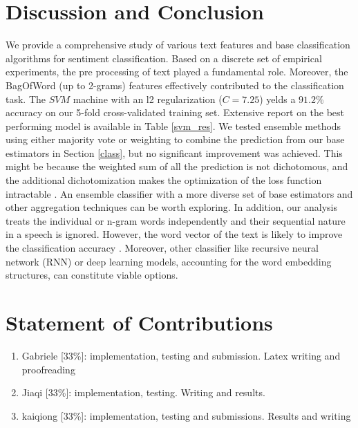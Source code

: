 \documentclass[twoside,twocolumn]{article}
\begin{document}
\section{Discussion and Conclusion}
We provide a comprehensive study of various text features and base classification algorithms for sentiment classification. Based on a discrete set of empirical experiments, the pre processing of text played a fundamental role. Moreover, the BagOfWord (up to 2-grams) features effectively contributed to the classification task. The $SVM$ machine with an l2 regularization ($C=7.25$) yelds a $91.2\%$ accuracy on our 5-fold cross-validated training set. Extensive report on the best performing model is available in Table \ref{svm_res}.
We tested ensemble methods using either majority vote or weighting to combine the prediction from our base estimators in Section \ref{class}, but no significant improvement was achieved. This might be because the weighted sum of all the prediction is not dichotomous, and the additional dichotomization makes the optimization of the loss function intractable \cite{polley2010super}. An ensemble classifier with a more diverse set of base estimators and other aggregation techniques \citep{parvin2013classifier} can be worth exploring.   
In addition, our analysis treats the individual or n-gram words independently and their sequential nature in a speech is ignored. However, the word vector of the text is likely to improve the classification accuracy \citep{mikolov2013exploiting}. Moreover, other classifier like recursive neural network (RNN) or deep learning models, accounting for the word embedding structures, can constitute viable options. 

\section*{Statement of Contributions}
\begin{enumerate}[topsep=2pt,itemsep=0ex,partopsep=1ex,parsep=1ex]

	\item Gabriele [33\%]: implementation, testing and submission. Latex writing and proofreading
	\item Jiaqi [33\%]: implementation, testing. Writing and results.
	\item kaiqiong [33\%]: implementation, testing and submissions. Results and writing

\end{enumerate}



\renewcommand*{\bibfont}{\footnotesize}





\end{document}
